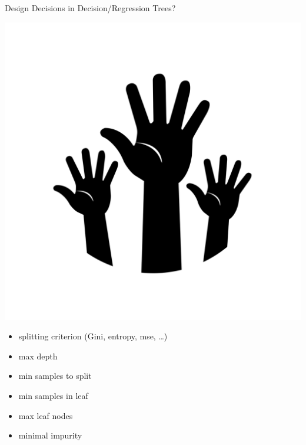 \begin{frame}[c]{Design Decisions in Decision/Regression Trees?}

\includegraphics[scale=0.05]{images/hands}
\pause

\begin{itemize}
  \item splitting criterion (Gini, entropy, mse, \ldots)
  \item max depth
  \item min samples to split
  \item min samples in leaf
  \item max leaf nodes
  \item minimal impurity 
\end{itemize}

\end{frame}
